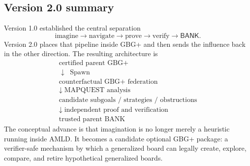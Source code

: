 \documentclass[11pt]{article}
\newcommand{\BANK}{\ensuremath{\mathsf{BANK}}}
\begin{document}
\subsection{Version 2.0 summary}

Version 1.0 established the central separation
\[
\text{imagine}\to\text{navigate}\to\text{prove}\to\text{verify}\to\BANK.
\]
Version 2.0 places that pipeline inside GBG+ and then sends the influence back in the other direction.  The resulting architecture is
\[
\boxed{
\begin{array}{c}
\text{certified parent GBG+}\\
\downarrow\;\operatorname{Spawn}\\
\text{counterfactual GBG+ federation}\\
\downarrow\;\text{MAPQUEST analysis}\\
\text{candidate subgoals / strategies / obstructions}\\
\downarrow\;\text{independent proof and verification}\\
\text{trusted parent BANK}
\end{array}}
\]
The conceptual advance is that imagination is no longer merely a heuristic running inside AMLD.  It becomes a candidate optional GBG+ package: a verifier-safe mechanism by which a generalized board can legally create, explore, compare, and retire hypothetical generalized boards.
\end{document}

